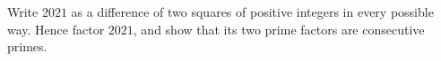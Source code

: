 Write $2021$ as a difference of two squares of positive integers in every possible way. Hence factor $2021$, and show that its two prime factors are consecutive primes.
